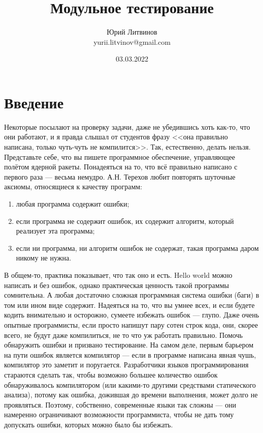 \documentclass[a5paper]{article}
\title{Модульное тестирование}
\author{Юрий Литвинов\\\small{yurii.litvinov@gmail.com}}
\date{03.03.2022}
\begin{document}
\maketitle
\thispagestyle{empty}

\section{Введение}

Некоторые посылают на проверку задачи, даже не убедившись хоть как-то, что они работают, и я правда слышал от студентов фразу <<она правильно написана, только чуть-чуть не компилится>>. Так, естественно, делать нельзя. Представьте себе, что вы пишете программное обеспечение, управляющее полётом ядерной ракеты. Понадеяться на то, что всё правильно написано с первого раза --- весьма немудро. А.Н. Терехов любит повторять шуточные аксиомы, относящиеся к качеству программ:

\begin{enumerate}
    \item любая программа содержит ошибки;
    \item если программа не содержит ошибок, их содержит алгоритм, который реализует эта программа;
    \item если ни программа, ни алгоритм ошибок не содержат, такая программа даром никому не нужна.
\end{enumerate}

В общем-то, практика показывает, что так оно и есть. Hello world можно написать и без ошибок, однако практическая ценность такой программы сомнительна. А любая достаточно сложная программная система ошибки (баги) в том или ином виде содержит. Надеяться на то, что вы умнее всех, и если будете кодить внимательно и осторожно, сумеете избежать ошибок --- глупо. Даже очень опытные программисты, если просто напишут пару сотен строк кода, они, скорее всего, не будут даже компилиться, не то что уж работать правильно. Помочь обнаружить ошибки и призвано тестирование. На самом деле, первым барьером на пути ошибок является компилятор --- если в программе написана явная чушь, компилятор это заметит и поругается. Разработчики языков программирования стараются сделать так, чтобы возможно большее количество ошибок обнаруживалось компилятором (или какими-то другими средствами статического анализа), потому как ошибка, дожившая до времени выполнения, может долго не проявляться. Поэтому, собственно, современные языки так сложны --- они намеренно ограничивают возможности программиста, чтобы не дать тому допускать ошибки, которых можно было бы избежать.
\end{document}
